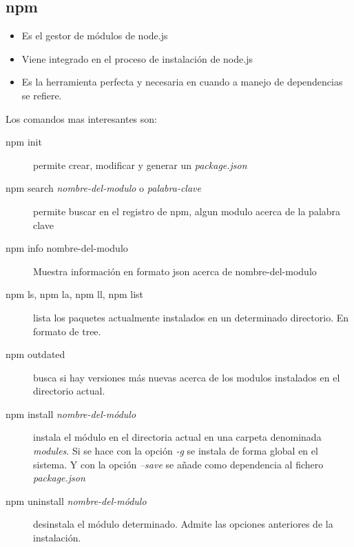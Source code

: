 \documentclass[4paper]{article}
\newcommand{\N}{node.js}
\begin{document}
\newpage


\subsection{npm}
\begin{itemize}
\item Es el gestor de módulos de \N
\item Viene integrado en el proceso de instalación de \N
\item Es la herramienta perfecta y necesaria en cuando a manejo de dependencias se refiere.
\end{itemize}
Los comandos mas interesantes son:
\begin{description}
\item[npm init] permite crear, modificar y generar un \emph{package.json}
\item[npm search \emph{nombre-del-modulo} o \emph{palabra-clave}]  permite buscar en el registro de npm, algun modulo acerca de la palabra clave
\item[npm info nombre-del-modulo] Muestra información en formato json acerca de nombre-del-modulo
\item[npm ls, npm la, npm ll, npm list] lista los paquetes actualmente instalados en un determinado directorio. En formato de tree.
\item[npm outdated] busca si hay versiones más nuevas acerca de los modulos instalados en el directorio actual.
\item[npm install \emph{nombre-del-módulo}] instala el módulo en el directoria actual en una carpeta denominada \emph{modules}. Si se hace con la opción \emph{-g} se instala de forma global en el sistema. Y con la opción \emph{--save} se añade como dependencia al fichero \emph{package.json}
\item[npm uninstall \emph{nombre-del-módulo}] desinstala el módulo determinado. Admite las opciones anteriores de la instalación.
 \end{description}
 
\end{document}
